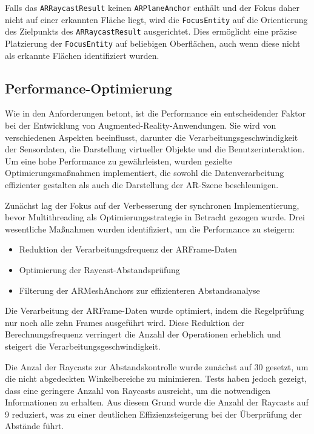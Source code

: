 Falls das \texttt{ARRaycastResult} keinen \texttt{ARPlaneAnchor} enthält und der Fokus daher nicht auf einer erkannten Fläche liegt, wird die \texttt{FocusEntity} auf die Orientierung des Zielpunkts des \texttt{ARRaycastResult} ausgerichtet. Dies ermöglicht eine präzise Platzierung der \texttt{FocusEntity} auf beliebigen Oberflächen, auch wenn diese nicht als erkannte Flächen identifiziert wurden.

\subsection{Performance-Optimierung}

Wie in den Anforderungen betont, ist die Performance ein entscheidender Faktor bei der Entwicklung von Augmented-Reality-Anwendungen. Sie wird von verschiedenen Aspekten beeinflusst, darunter die Verarbeitungsgeschwindigkeit der Sensordaten, die Darstellung virtueller Objekte und die Benutzerinteraktion. Um eine hohe Performance zu gewährleisten, wurden gezielte Optimierungsmaßnahmen implementiert, die sowohl die Datenverarbeitung effizienter gestalten als auch die Darstellung der AR-Szene beschleunigen.

Zunächst lag der Fokus auf der Verbesserung der synchronen Implementierung, bevor Multithreading als Optimierungsstrategie in Betracht gezogen wurde. Drei wesentliche Maßnahmen wurden identifiziert, um die Performance zu steigern:

\begin{itemize}
\item Reduktion der Verarbeitungsfrequenz der ARFrame-Daten
\item Optimierung der Raycast-Abstandsprüfung
\item Filterung der ARMeshAnchors zur effizienteren Abstandsanalyse
\end{itemize}

Die Verarbeitung der ARFrame-Daten wurde optimiert, indem die Regelprüfung nur noch alle zehn Frames ausgeführt wird. Diese Reduktion der Berechnungsfrequenz verringert die Anzahl der Operationen erheblich und steigert die Verarbeitungsgeschwindigkeit.

Die Anzal der Raycasts zur Abstandskontrolle wurde zunächst auf 30 gesetzt, um die nicht abgedeckten Winkelbereiche zu minimieren. Tests haben jedoch gezeigt, dass eine geringere Anzahl von Raycasts ausreicht, um die notwendigen Informationen zu erhalten. Aus diesem Grund wurde die Anzahl der Raycasts auf 9 reduziert, was zu einer deutlichen Effizienzsteigerung bei der Überprüfung der Abstände führt.

